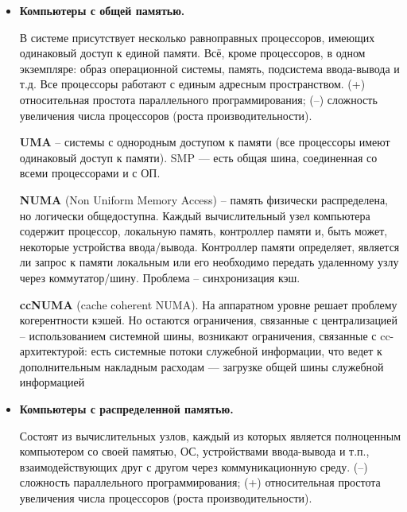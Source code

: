 \begin{itemize}
    \item \textbf{Компьютеры с общей памятью.}
    
    В системе присутствует несколько равноправных процессоров, имеющих одинаковый доступ к единой памяти. Всё, кроме процессоров, в одном экземпляре: образ операционной системы, память, подсистема ввода-вывода и т.д. Все процессоры работают с единым адресным пространством. (+) относительная простота параллельного программирования; (–) сложность увеличения числа процессоров (роста производительности).
    
    \textbf{UMA} -- системы с однородным доступом к памяти (все процессоры имеют одинаковый доступ к памяти). SMP --- есть общая шина, соединенная со всеми процессорами и с ОП.
    
    \textbf{NUMA} (Non Uniform Memory Access) -- память физически распределена, но логически общедоступна. Каждый вычислительный узел компьютера содержит процессор, локальную память, контроллер памяти и, быть может, некоторые устройства ввода/вывода. Контроллер памяти определяет, является ли запрос к памяти локальным или его необходимо передать удаленному узлу через коммутатор/шину. Проблема -- синхронизация кэш. 
    
    \textbf{ccNUMA} (cache coherent NUMA). На аппаратном уровне решает проблему когерентности кэшей. Но остаются ограничения, связанные с централизацией -- использованием системной шины, возникают ограничения, связанные с cc-архитектурой: есть системные потоки служебной информации, что ведет к дополнительным накладным расходам --- загрузке общей шины служебной информацией
    
    \item \textbf{Компьютеры с распределенной памятью.}
    
    Состоят из вычислительных узлов, каждый из которых является полноценным компьютером со своей памятью, ОС, устройствами ввода-вывода и т.п., взаимодействующих друг с другом через коммуникационную среду.
    (–) сложность параллельного программирования;
    (+) относительная простота увеличения числа процессоров (роста производительности).
\end{itemize}

